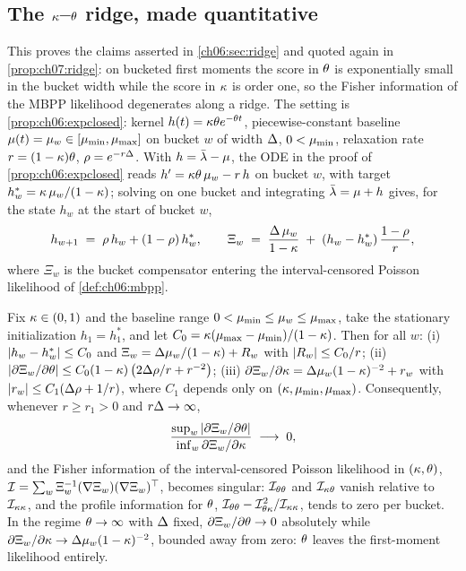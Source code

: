 \subsection{The $\kappa$--$\theta$ ridge, made quantitative}

This proves the claims asserted in \cref{ch06:sec:ridge} and quoted again in \cref{prop:ch07:ridge}:
on bucketed first moments the score in $\theta$ is exponentially small in the bucket width while the
score in $\kappa$ is order one, so the Fisher information of the MBPP likelihood degenerates along a
ridge. The setting is \cref{prop:ch06:expclosed}: kernel $h(t) = \kappa\theta e^{-\theta t}$,
piecewise-constant baseline $\mu(t) = \mu_w \in [\mu_{\min}, \mu_{\max}]$ on bucket $w$ of width
$\Delta$, $0 < \mu_{\min}$, relaxation rate $r = (1-\kappa)\theta$, $\rho = e^{-r\Delta}$. With
$h = \bar{\lambda} - \mu$, the ODE in the proof of \cref{prop:ch06:expclosed} reads $h' =
\kappa\theta\,\mu_w - r\,h$ on bucket $w$, with target $h_w^\ast = \kappa\,\mu_w/(1-\kappa)$;
solving on one bucket and integrating $\bar{\lambda} = \mu + h$ gives, for the state $h_w$ at the start of
bucket $w$,
\begin{equation}
\label{eq:app:pf:state}
h_{w+1} \;=\; \rho\, h_w + (1 - \rho)\, h_w^\ast,
\qquad
\Xi_w \;=\; \frac{\Delta\,\mu_w}{1-\kappa} \;+\; (h_w - h_w^\ast)\,\frac{1-\rho}{r},
\end{equation}
where $\Xi_w$ is the bucket compensator entering the interval-censored Poisson likelihood of
\cref{def:ch06:mbpp}.
\begin{proposition}
\label{app:pf:ridge}
Fix $\kappa \in (0,1)$ and the baseline range $0 < \mu_{\min} \le \mu_w \le \mu_{\max}$, take the
stationary initialization $h_1 = h_1^\ast$, and let $C_0 = \kappa(\mu_{\max} -
\mu_{\min})/(1-\kappa)$. Then for all $w$: (i) $\left|h_w - h_w^\ast\right| \le C_0$ and $\Xi_w = \Delta
\mu_w/(1-\kappa) + R_w$ with $\left|R_w\right| \le C_0/r$; (ii) $\left|\partial \Xi_w / \partial\theta\right| \le
C_0 (1-\kappa)\, \big( 2\Delta\rho/r + r^{-2} \big)$; (iii) $\partial \Xi_w / \partial\kappa =
\Delta \mu_w (1-\kappa)^{-2} + r_w$ with $\left|r_w\right| \le C_1 (\Delta \rho + 1/r)$, where $C_1$
depends only on $(\kappa, \mu_{\min}, \mu_{\max})$. Consequently, whenever $r \ge r_1 > 0$ and
$r\Delta \to \infty$,
\[
\frac{\sup_w \left|\partial \Xi_w/\partial\theta\right|}{\inf_w \partial \Xi_w/\partial\kappa}
\;\longrightarrow\; 0,
\]
and the Fisher information of the interval-censored Poisson likelihood in $(\kappa, \theta)$,
$\mathcal{I} = \sum_w \Xi_w^{-1} (\nabla \Xi_w)(\nabla \Xi_w)^{\top}$, becomes singular:
$\mathcal{I}_{\theta\theta}$ and $\mathcal{I}_{\kappa\theta}$ vanish relative to
$\mathcal{I}_{\kappa\kappa}$, and the profile information for $\theta$, $\mathcal{I}_{\theta\theta} -
\mathcal{I}_{\theta\kappa}^2/\mathcal{I}_{\kappa\kappa}$, tends to zero per bucket. In the regime $\theta
\to \infty$ with $\Delta$ fixed, $\partial \Xi_w/\partial\theta \to 0$ absolutely while $\partial
\Xi_w/\partial\kappa \to \Delta \mu_w (1-\kappa)^{-2}$, bounded away from zero: $\theta$ leaves
the first-moment likelihood entirely.
\end{proposition}
